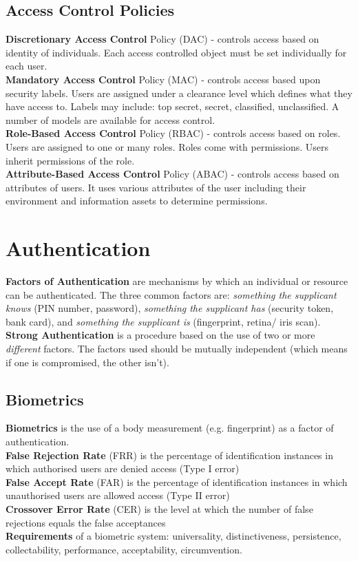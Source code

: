 \documentclass[a4paper,11pt]{article}
\begin{document}
\subsection{Access Control Policies}
\textbf{Discretionary Access Control} Policy (DAC) - controls access based on identity of individuals. Each access controlled object must be set individually for each user.\\
\textbf{Mandatory Access Control} Policy (MAC) - controls access based upon security labels. Users are assigned under a clearance level which defines what they have access to. Labels may include: top secret, secret, classified, unclassified. A number of models are available for access control.\\
\textbf{Role-Based Access Control} Policy (RBAC) - controls access based on roles. Users are assigned to one or many roles. Roles come with permissions. Users inherit permissions of the role.\\
\textbf{Attribute-Based Access Control} Policy (ABAC) - controls access based on attributes of users. It uses various attributes of the user including their environment and information assets to determine permissions.\\

\section{Authentication}
\textbf{Factors of Authentication} are mechanisms by which an individual or resource can be authenticated. The three common factors are: \textit{something the supplicant knows} (PIN number, password), \textit{something the supplicant has} (security token, bank card), and \textit{something the supplicant is} (fingerprint, retina/ iris scan).\\
\textbf{Strong Authentication} is a procedure based on the use of two or more \textit{different} factors. The factors used should be mutually independent (which means if one is compromised, the other isn't).\\
\subsection{Biometrics}
\textbf{Biometrics} is the use of a body measurement (e.g. fingerprint) as a factor of authentication.\\
\textbf{False Rejection Rate} (FRR) is the percentage of identification instances in which authorised users are denied access (Type I error)\\
\textbf{False Accept Rate} (FAR) is the percentage of identification instances in which unauthorised users are allowed access (Type II error)\\
\textbf{Crossover Error Rate} (CER) is the level at which the number of false rejections equals the false acceptances\\
\textbf{Requirements} of a biometric system: universality, distinctiveness, persistence, collectability, performance, acceptability, circumvention.
\end{document}
